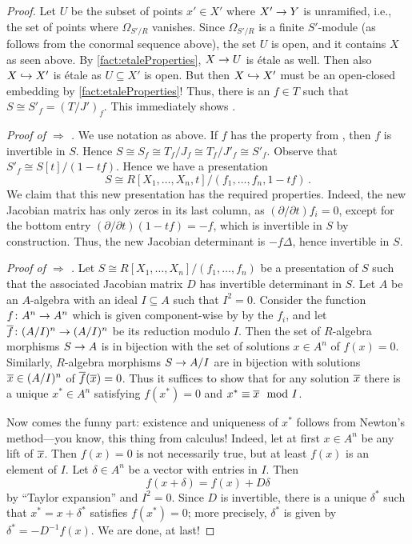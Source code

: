 \documentclass[a4paper, 10pt, oneside, DIV=9, chapterprefix=true, numbers=enddot, bibliography=totoc]{scrbook}
\begin{document}
\begin{proof}
	Let $U$ be the subset of points $x'\in X'$ where $X'\morphism Y$ is unramified, i.e., the set of points where $\Omega_{S'/R}$ vanishes. Since $\Omega_{S'/R}$ is a finite $S'$-module (as follows from the conormal sequence above), the set $U$ is open, and it contains $X$ as seen above. By \cref{fact:etaleProperties}, $X\morphism U$ is étale as well. Then also $X\monomorphism X'$ is étale as $U\subseteq X'$ is open. But then $X\monomorphism X'$ must be an open-closed embedding by \cref{fact:etaleProperties}! Thus, there is an $f\in T$ such that $S\cong S'_f=(T/J')_f$. This immediately shows .
	
	\emph{Proof of  $\Rightarrow$ .} We use notation as above. If $f$ has the property from , then $f$ is invertible in $S$. Hence $S\cong S_f\cong T_f/J_f\cong T_f/J'_f\cong S'_f$. Observe that $S'_f\cong S[t]/(1-tf)$. Hence we have a presentation 
	\begin{equation*}
		S\cong R[X_1,\dotsc,X_n,t]/(f_1,\dotsc,f_n,1-tf)\,.
	\end{equation*}
	We claim that this new presentation has the required properties. Indeed, the new Jacobian matrix has only zeros in its last column, as $(\partial/\partial t)f_i=0$, except for the bottom entry $(\partial/\partial t)(1-tf)=-f$, which is invertible in $S$ by construction. Thus, the new Jacobian determinant is $-f\Delta$, hence invertible in $S$.
	
	\emph{Proof of  $\Rightarrow$ .} Let $S\cong R[X_1,\dotsc,X_n]/(f_1,\dotsc,f_n)$ be a presentation of $S$ such that the associated Jacobian matrix $D$ has invertible determinant in $S$. Let $A$ be an $A$-algebra with an ideal $I\subseteq A$ such that $I^2=0$.  Consider the function $f\colon A^n\morphism A^n$ which is given component-wise by by the $f_i$, and let $\ov{f}\colon (A/I)^n\morphism (A/I)^n$ be its reduction modulo $I$. Then the set of $R$-algebra morphisms $S\morphism A$ is in bijection with the set of solutions $x\in A^n$ of $f(x)=0$. Similarly, $R$-algebra morphisms $S\morphism A/I$ are in bijection with solutions $\ov{x}\in (A/I)^n$ of $\ov{f}(\ov{x})=0$. Thus it suffices to show that for any solution $\ov{x}$ there is a unique $x^*\in A^n$ satisfying $f(x^*)=0$ and $x^*\equiv \ov{x}\mod I$.
	
	Now comes the funny part: existence and uniqueness of $x^*$ follows from Newton's method---you know, this thing from calculus! Indeed, let at first $x\in A^n$ be any lift of $\ov{x}$. Then $f(x)=0$ is not necessarily true, but at least $f(x)$ is an element of $I$. Let $\delta\in A^n$ be a vector with entries in $I$. Then 
	\begin{equation*}
		f(x+\delta)=f(x)+D\delta
	\end{equation*}
	by \enquote{Taylor expansion} and $I^2=0$. Since $D$ is invertible, there is a unique $\delta^*$ such that $x^*=x+\delta^*$ satisfies $f(x^*)=0$; more precisely, $\delta^*$ is given by $\delta^*=-D^{-1}f(x)$. We are done, at last!
\end{proof}
\end{document}
